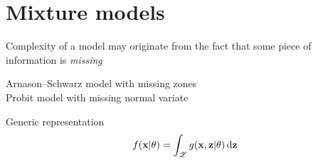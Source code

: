 \section{Mixture models}
\begin{slide}
\tableofcontents[sectionstyle=show/hide,subsectionstyle=show/shaded/hide]

\end{slide}
\begin{slide}

Complexity of a model may originate from the fact
that some piece of information is {\em missing}

\vs\pause
\begin{example}
Arnason--Schwarz model with missing zones\\
Probit model with missing normal variate
\end{example}

\vs\pause
Generic representation
$$
f(\mathbf{x}|\theta) = \int_\mathscr{Z} g(\mathbf{x},{\bf z}|\theta)\,\hbox{d}{\bf z}
$$
\end{slide}
